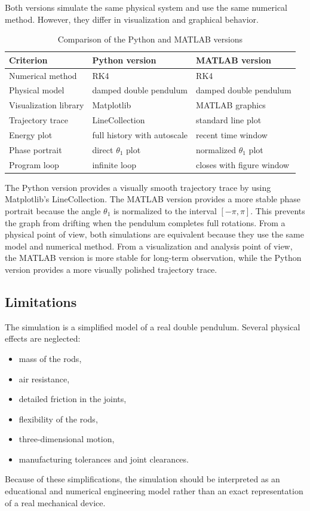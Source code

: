 \documentclass[12pt,a4paper]{article}
\begin{document}
Both versions simulate the same physical system and use the same numerical method. However, they differ in visualization and graphical behavior.
\begin{table}[H]
\centering
\caption{Comparison of the Python and MATLAB versions}
\label{tab:comparison}
\begin{tabular}{lll}
\toprule
Criterion & Python version & MATLAB version \\
\midrule
Numerical method & RK4 & RK4 \\
Physical model & damped double pendulum & damped double pendulum \\
Visualization library & Matplotlib & MATLAB graphics \\
Trajectory trace & LineCollection & standard line plot \\
Energy plot & full history with autoscale & recent time window \\
Phase portrait & direct $\theta_1$ plot & normalized $\theta_1$ plot \\
Program loop & infinite loop & closes with figure window \\
\bottomrule
\end{tabular}
\end{table}
\noindent
The Python version provides a visually smooth trajectory trace by using Matplotlib's LineCollection. The MATLAB version provides a more stable phase portrait because the angle $\theta_1$ is normalized to the interval $[-\pi,\pi]$. This prevents the graph from drifting when the pendulum completes full rotations. From a physical point of view, both simulations are equivalent because they use the same model and numerical method. From a visualization and analysis point of view, the MATLAB version is more stable for long-term observation, while the Python version provides a more visually polished trajectory trace.


\subsection{Limitations}

The simulation is a simplified model of a real double pendulum. Several physical effects are neglected:

\begin{itemize}
    \item mass of the rods,
    \item air resistance,
    \item detailed friction in the joints,
    \item flexibility of the rods,
    \item three-dimensional motion,
    \item manufacturing tolerances and joint clearances.
\end{itemize}
\noindent
Because of these simplifications, the simulation should be interpreted as an educational and numerical engineering model rather than an exact representation of a real mechanical device.
\end{document}

